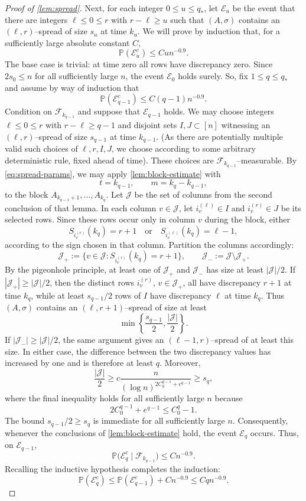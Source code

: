 \documentclass[reqno,english]{amsart}
\newcommand*{\PP}{\mathbb P}
\newcommand*{\calF}{\mathcal F}
\theoremstyle{definition}
\begin{document}
\begin{proof}[Proof of \cref{lem:spread}]
Next, for each integer $0\le u\le q_*$, let $\mathcal E_u$ be the event that there
are integers $\ell\le0\le r$ with $r-\ell\ge u$ such that $(A,\sigma)$
contains an $(\ell,r)$--spread of size $s_u$ at time $k_u$. We will prove by
induction that, for a sufficiently large absolute constant $C$,
\[
    \PP(\mathcal E_u^c)\le Cu n^{-0.9}.
\]
The base case is trivial:
at time zero all rows have discrepancy zero. Since $2s_0\le n$ for all
sufficiently large $n$, the event $\mathcal E_0$ holds surely. So, fix $1\le q\le q_*$ and assume by way of induction that
\[
    \PP(\mathcal E_{q-1}^c)\le C(q-1)n^{-0.9}.
\]
Condition on $\calF_{k_{q-1}}$ and suppose
that $\mathcal E_{q-1}$ holds. We may choose 
integers $\ell\le0\le r$ with $r - \ell \ge q-1$  and disjoint sets
$I,J\subset[n]$ witnessing an $(\ell,r)$--spread of size
$s_{q-1}$ at time $k_{q-1}$. (As there are potentially multiple valid such choices of $\ell,r,I,J$,  we choose according to some arbitrary deterministic rule, fixed ahead of time). These choices are
$\calF_{k_{q-1}}$--measurable. By \eqref{eq:spread-params}, we may apply  \cref{lem:block-estimate} with
\[
    t=k_{q-1},\qquad
    m=k_q-k_{q-1},
\]
to the block $A_{k_{q-1}+1},\ldots,A_{k_q}$. Let $\mathcal J$ be the set
of columns from the second conclusion of that lemma. In each column
$v\in\mathcal J$, let $i_v^{(\ell)} \in I$ and $i_v^{(r)} \in J$ be its selected rows.
Since these rows occur only in column $v$ during the block, either
\[
    S_{i_v^{(r)}}(k_q)=r+1
    \quad\text{or}\quad
    S_{i_v^{(\ell)}}(k_q)=\ell-1,
\]
according to the sign chosen in that column. Partition the columns accordingly:
\[
    \mathcal J_+
    :=\{v\in\mathcal J:S_{i_v^{(r)}}(k_q)=r+1\},
    \qquad
    \mathcal J_-:=\mathcal J\setminus\mathcal J_+.
\]
By the pigeonhole principle, at least one of $\mathcal J_+$ and $\mathcal J_-$ has size at least
$|\mathcal J|/2$. If $|\mathcal J_+|\ge|\mathcal J|/2$, then the distinct
rows $i_v^{(r)}$, $v\in\mathcal J_+$, all have discrepancy $r+1$ at time
$k_q$, while at least $s_{q-1}/2$ rows of $I$ have discrepancy
$\ell$ at time $k_q$. Thus $(A,\sigma)$ contains an
$(\ell,r+1)$--spread of size at least
\[
    \min\left\{\frac{s_{q-1}}2,\frac{|\mathcal J|}2\right\}.
\]
If $|\mathcal J_-|\ge|\mathcal J|/2$, the same argument gives an
$(\ell-1,r)$--spread of at least this size. In either case, the difference
between the two discrepancy values has increased by one and is therefore
at least $q$. Moreover,
\[
    \frac{|\mathcal J|}{2}
    \ge c\frac{n}
        {(\log n)^{2C_0^{q-1}+e^{q-1}}}
    \ge s_q,
\]
where the final inequality holds for all sufficiently large $n$ because
\[
    2C_0^{q-1}+e^{q-1}\le C_0^q-1.
\]
The bound $s_{q-1}/2\ge s_q$ is immediate for all sufficiently large $n$.
Consequently, whenever the conclusions of \cref{lem:block-estimate} hold,
the event $\mathcal E_q$ occurs. Thus, on $\mathcal E_{q-1}$,
\[
    \PP\big(\mathcal E_q^c\mid\calF_{k_{q-1}}\big)
    \le Cn^{-0.9}.
\]
Recalling the inductive hypothesis completes the induction:
\[
    \PP(\mathcal E_q^c)
    \le \PP(\mathcal E_{q-1}^c)+Cn^{-0.9}
    \le Cq n^{-0.9}.
\]

\end{proof}
\end{document}

